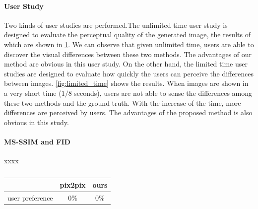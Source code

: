 \paragraph{User Study} Two kinds of user studies are performed.The unlimited time user study is designed to evaluate the perceptual quality of the generated image, the results of which are shown in  \ref{table:unlimited_time}. We can observe that given unlimited time, users are able to discover the visual differences between these two methods. The advantages of our method are obvious in this user study. On the other hand, the limited time user studies are designed to evaluate how quickly the users can perceive the differences between images.  \ref{fig:limited_time} shows the results. When images are shown in a very short time ($1/8$ seconds), users are not able to sense the differences among these two methods and the ground truth. With the increase of the time, more differences are perceived by users. The advantages of the proposed method is also obvious in this study.
\paragraph{MS-SSIM and FID} xxxx
%
%
\begin{table}[h]
	\centering	
	\caption{}
	\begin{tabular}{|l|c|c|}\hline
		 & pix2pix & ours \\\hline
		user preference&$0\%$&$0\%$\\\hline
	\end{tabular}
	\label{table:unlimited_time}
\end{table}



